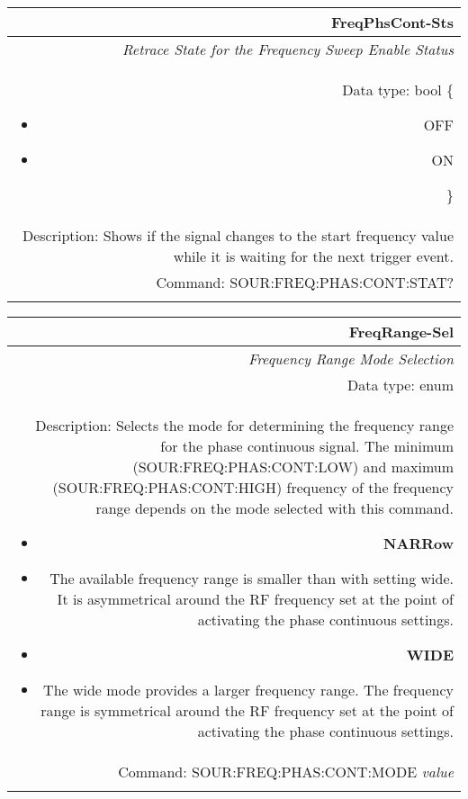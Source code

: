 \documentclass[openany]{article}
\begin{document}
		\begin{tabular}{N}
			\hline
			\bfseries FreqPhsCont-Sts \\ \hline
			\emph{Retrace State for the Frequency Sweep Enable Status} \\
			Data type: bool \{\begin{itemize}[noitemsep]
				\small
				\item[] OFF
				\item[] ON
			\end{itemize}\} \\
			Description: Shows if the signal changes to the start frequency value while it is waiting for the next trigger event. \\
			Command: SOUR:FREQ:PHAS:CONT:STAT? \\
			\\

		\end{tabular}


		\begin{tabular}{N}
			\hline
			\bfseries FreqRange-Sel \\ \hline
			\emph{Frequency Range Mode Selection} \\
			Data type: enum \\
			Description: Selects the mode for determining the frequency range for the phase continuous signal. The minimum (SOUR:FREQ:PHAS:CONT:LOW) and maximum (SOUR:FREQ:PHAS:CONT:HIGH) frequency of the frequency range depends on the mode selected with this command.\begin{itemize}[noitemsep]
				\small
				\item[] \textbf{NARRow}
				\item[] The available frequency range is smaller than with setting wide. It is asymmetrical around the RF frequency set at the point of activating the phase continuous settings.
				\item[] \textbf{WIDE}
				\item[] The wide mode provides a larger frequency range. The frequency range is symmetrical around the RF frequency set at the point of activating the phase continuous settings.
			\end{itemize} \\
			Command: SOUR:FREQ:PHAS:CONT:MODE \emph{value} \\
			\\

		\end{tabular}
\end{document}
